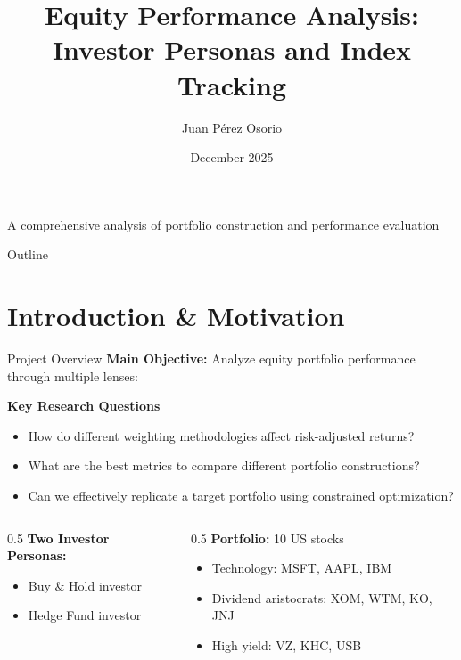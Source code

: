 \documentclass[12pt, aspectratio=43]{beamer}
\title{Equity Performance Analysis: \\ Investor Personas and Index Tracking}
\author{Juan Pérez Osorio}
\institute{Department of Applied Mathematics and Statistics \\ Stony Brook University}
\date{December 2025}
\begin{document}
	
	\begin{frame}
		\titlepage
		\centering
		\vspace{1em}
		\small\color{darkgray}A comprehensive analysis of portfolio construction and performance evaluation
	\end{frame}
	
	\begin{frame}{Outline}
		\tableofcontents
	\end{frame}
	
	\section{Introduction \& Motivation}
	
	\begin{frame}{Project Overview}
		\textbf{Main Objective:} Analyze equity portfolio performance through multiple lenses:
		\vspace{2mm}
		\begin{block}{\textbf{Key Research Questions}}
			\begin{itemize}
				\item How do different weighting methodologies affect risk-adjusted returns?
				\item What are the best metrics to compare different portfolio constructions?
				\item Can we effectively replicate a target portfolio using constrained optimization?
			\end{itemize}
		\end{block}
	\end{frame}	
	
	\begin{frame}
		\begin{columns}[T]
			\begin{column}{0.5\textwidth}
				\textbf{Two Investor Personas:}
				\begin{itemize}
					\item \alert{Buy \& Hold} investor
					\item \alert{Hedge Fund} investor
				\end{itemize}
			\end{column}
			\begin{column}{0.5\textwidth}
				\textbf{Portfolio:} 10 US stocks
				\begin{itemize}
					\item Technology: MSFT, AAPL, IBM
					\item Dividend aristocrats: XOM, WTM, KO, JNJ
					\item High yield: VZ, KHC, USB
				\end{itemize}
			\end{column}
		\end{columns}
	\end{frame}
	
\end{document}
